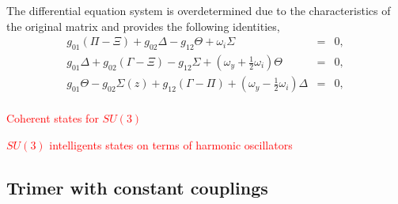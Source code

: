 \documentclass[9pt,twocolumn,twoside]{osajnl}
\begin{document}
The differential equation system is overdetermined due to the characteristics of the original matrix and provides the following identities,
\begin{eqnarray}
g_{01} \left( \Pi - \Xi \right) + g_{02} \Delta - g_{12} \Theta + \omega_{i} \Sigma &=& 0, \\
g_{01} \Delta + g_{02} \left( \Gamma - \Xi \right) - g_{12} \Sigma + \left(  \omega_{y} +\frac{1}{2}\omega_{i}   \right) \Theta &=& 0, \\
g_{01} \Theta - g_{02} \Sigma(z) + g_{12} \left( \Gamma - \Pi \right)  + \left(  \omega_{y} - \frac{1}{2}\omega_{i}\right) \Delta &=& 0, \\
\end{eqnarray}





\textcolor{red}{Coherent states for $SU(3)$ \cite{Gnutzmann1998p9871}}

\textcolor{red}{$SU(3)$ intelligents states on terms of harmonic oscillators \cite{Rowe1999p3604}}



\subsection{Trimer with constant couplings}
\end{document}
